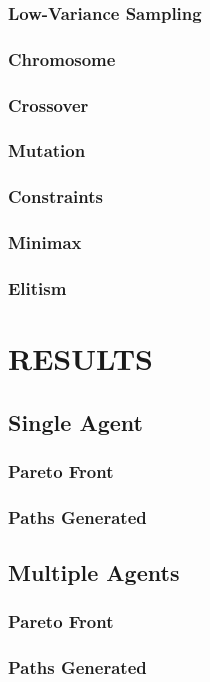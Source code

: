 \documentclass[letterpaper, 10 pt, conference]{ieeeconf}  %
\begin{document}
\subsubsection{Low-Variance Sampling}
\subsubsection{Chromosome}
\subsubsection{Crossover}
\subsubsection{Mutation}
\subsubsection{Constraints}
\subsubsection{Minimax}
\subsubsection{Elitism}
\section{RESULTS}\label{results}
\subsection{Single Agent}
\subsubsection{Pareto Front}
\subsubsection{Paths Generated}
\subsection{Multiple Agents}
\subsubsection{Pareto Front}
\subsubsection{Paths Generated}
\end{document}
